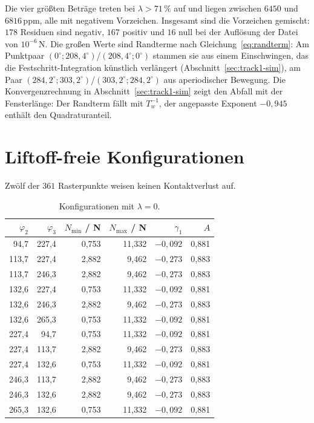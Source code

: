 \documentclass[12pt,a4paper]{report}
\begin{document}
Die vier größten Beträge treten bei $\lambda > 71\,\%$ auf und liegen
zwischen $6450$ und $6816\,\mathrm{ppm}$, alle mit negativem Vorzeichen.
Insgesamt sind die Vorzeichen gemischt: $178$ Residuen sind negativ,
$167$ positiv und $16$ null bei der Auflösung der Datei von
$10^{-6}\,\mathrm{N}$. Die großen Werte sind Randterme nach
Gleichung~\eqref{eq:randterm}: Am Punktpaar
$(0^\circ; 208{,}4^\circ)$/$(208{,}4^\circ; 0^\circ)$ stammen sie aus
einem Einschwingen, das die Festschritt-Integration künstlich verlängert
(Abschnitt~\ref{sec:track1-sim}), am Paar
$(284{,}2^\circ; 303{,}2^\circ)$/$(303{,}2^\circ; 284{,}2^\circ)$ aus
aperiodischer Bewegung. Die Konvergenzrechnung in
Abschnitt~\ref{sec:track1-sim} zeigt den Abfall mit der Fensterlänge:
Der Randterm fällt mit $T_w^{-1}$, der angepasste Exponent $-0{,}945$
enthält den Quadraturanteil.

\section{Liftoff-freie Konfigurationen}
\label{sec:anh-liftoff-frei}

Zwölf der $361$ Rasterpunkte weisen keinen Kontaktverlust auf.

\begin{table}[htbp]
  \centering
  \begin{tabular}{rrrrrr}
    \hline
    $\varphi_2$ & $\varphi_3$ & $N_{\min}$ / N & $N_{\max}$ / N & $\gamma_1$ & $A$ \\
    \hline
     94{,}7 & 227{,}4 & 0{,}753 & 11{,}332 & $-0{,}092$ & 0{,}881 \\
    113{,}7 & 227{,}4 & 2{,}882 &  9{,}462 & $-0{,}273$ & 0{,}883 \\
    113{,}7 & 246{,}3 & 2{,}882 &  9{,}462 & $-0{,}273$ & 0{,}883 \\
    132{,}6 & 227{,}4 & 0{,}753 & 11{,}332 & $-0{,}092$ & 0{,}881 \\
    132{,}6 & 246{,}3 & 2{,}882 &  9{,}462 & $-0{,}273$ & 0{,}883 \\
    132{,}6 & 265{,}3 & 0{,}753 & 11{,}332 & $-0{,}092$ & 0{,}881 \\
    227{,}4 &  94{,}7 & 0{,}753 & 11{,}332 & $-0{,}092$ & 0{,}881 \\
    227{,}4 & 113{,}7 & 2{,}882 &  9{,}462 & $-0{,}273$ & 0{,}883 \\
    227{,}4 & 132{,}6 & 0{,}753 & 11{,}332 & $-0{,}092$ & 0{,}881 \\
    246{,}3 & 113{,}7 & 2{,}882 &  9{,}462 & $-0{,}273$ & 0{,}883 \\
    246{,}3 & 132{,}6 & 2{,}882 &  9{,}462 & $-0{,}273$ & 0{,}883 \\
    265{,}3 & 132{,}6 & 0{,}753 & 11{,}332 & $-0{,}092$ & 0{,}881 \\
    \hline
  \end{tabular}
  \caption{Konfigurationen mit $\lambda = 0$.}
  \label{tab:liftoff-frei}
\end{table}
\end{document}
